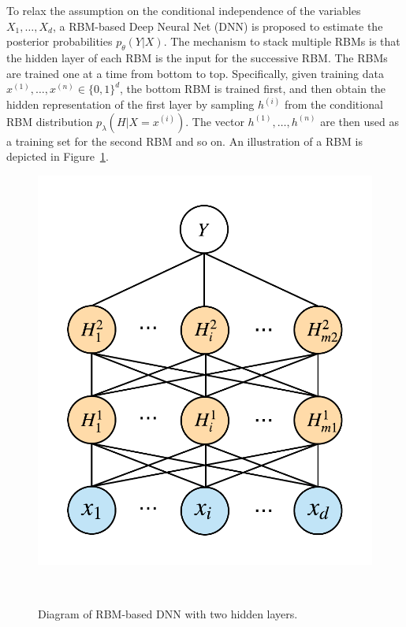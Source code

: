 \documentclass{article}
\begin{document}
To relax the assumption on the conditional independence of the
variables $X_1,\ldots,X_d$, a RBM-based Deep Neural Net (DNN) is
proposed to estimate the posterior probabilities
$p_{\theta}(Y|X)$. The mechanism to stack multiple RBMs is that the
hidden layer of each RBM is the input for the successive RBM. The RBMs
are trained one at a time from bottom to top. Specifically, given
training data $x^{(1)}, \ldots, x^{(n)} \in \{ 0,1 \}^d$, the bottom
RBM is trained first, and then obtain the hidden representation of the
first layer by sampling $h^{(i)}$ from the conditional RBM
distribution $p_{\lambda}(H|X=x^{(i)})$. The vector $h^{(1)}, \ldots,
h^{(n)}$ are then used as a training set for the second RBM and so
on. An illustration of a RBM is depicted in Figure~\ref{fg:rbm-dnn-model}.

\begin{figure}[h]
  \centering
  \includegraphics[width=0.75\columnwidth]{rbm-dnn.png}
  \caption{Diagram of RBM-based DNN with two hidden layers.}
  ~\label{fg:rbm-dnn-model}
\end{figure}
\end{document}
